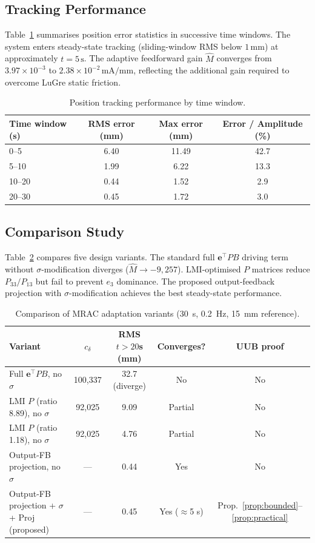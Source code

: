 \documentclass[12pt,a4paper]{article}
\theoremstyle{plain}
\theoremstyle{definition}
\theoremstyle{remark}
\newcommand{\Mh}{\hat{M}}       %
\newcommand{\e}{\mathbf{e}}     %
\begin{document}
\subsection{Tracking Performance}

Table~\ref{tab:performance} summarises position error statistics in
successive time windows.  The system enters steady-state tracking
(sliding-window RMS below $1\,\mathrm{mm}$) at approximately $t=5\,\mathrm{s}$.
The adaptive feedforward gain $\Mh$ converges from $3.97\times10^{-3}$
to $2.38\times10^{-2}\,\mathrm{mA/mm}$, reflecting the additional gain
required to overcome LuGre static friction.

\begin{table}[htbp]
\centering
\caption{Position tracking performance by time window.}
\label{tab:performance}
\begin{tabular}{lccc}
\toprule
Time window (s) & RMS error (mm) & Max error (mm) & Error / Amplitude (\%) \\
\midrule
0--5   & 6.40 & 11.49 & 42.7 \\
5--10  & 1.99 &  6.22 & 13.3 \\
10--20 & 0.44 &  1.52 &  2.9 \\
20--30 & 0.45 &  1.72 &  3.0 \\
\bottomrule
\end{tabular}
\end{table}

\subsection{Comparison Study}

Table~\ref{tab:comparison} compares five design variants.  The
standard full $\e^\top PB$ driving term without $\sigma$-modification
diverges ($\hat M\to-9{,}257$).  LMI-optimised $P$ matrices reduce
$P_{33}/P_{13}$ but fail to prevent $e_3$ dominance.  The proposed
output-feedback projection with $\sigma$-modification achieves the
best steady-state performance.

\begin{table}[htbp]
\centering
\caption{Comparison of MRAC adaptation variants (30~s, 0.2~Hz, 15~mm
         reference).}
\label{tab:comparison}
\begin{tabular}{lcccc}
\toprule
Variant & $c_\delta$ & RMS $t{>}20$s (mm) & Converges? & UUB proof \\
\midrule
Full $\e^\top PB$, no $\sigma$ & 100,337 & 32.7 (diverge) & No & No \\
LMI $P$ (ratio 8.89), no $\sigma$ & 92,025 & 9.09 & Partial & No \\
LMI $P$ (ratio 1.18), no $\sigma$ & 92,025 & 4.76 & Partial & No \\
Output-FB projection, no $\sigma$ & --- & 0.44 & Yes & No \\
\rowcolor{green!10}
Output-FB projection + $\sigma$ + Proj (proposed) & --- & 0.45 & Yes ($\approx$5 s) & Prop.~\ref{prop:bounded}--\ref{prop:practical} \\
\bottomrule
\end{tabular}
\end{table}
\end{document}
